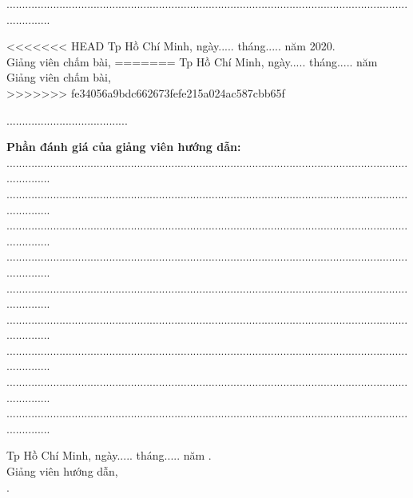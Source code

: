 	...............................................................................................................................................
\begin{center}
<<<<<<< HEAD
	\hspace*{5cm} Tp Hồ Chí Minh, ngày..... tháng..... năm 2020.\\
	\hspace*{5cm} Giảng viên chấm bài,
=======
	\hspace*{5cm} Tp Hồ Chí Minh, ngày..... tháng..... năm \.\\
	\hspace*{5cm} Giảng viên chấm bài,\\
>>>>>>> fe34056a9bdc662673fefe215a024ac587cbb65f
	\vspace{1.2cm}
	
	\hspace*{5cm} .......................................
\end{center}
	\vspace*{0.5cm}
	\textbf{Phần đánh giá của giảng viên hướng dẫn:}\\
	...............................................................................................................................................\\
	...............................................................................................................................................\\
	...............................................................................................................................................\\
	...............................................................................................................................................\\
	...............................................................................................................................................\\
	...............................................................................................................................................\\
	...............................................................................................................................................\\
	...............................................................................................................................................\\
	...............................................................................................................................................
\begin{center}
	\hspace*{5cm} Tp Hồ Chí Minh, ngày..... tháng..... năm \nam.\\
	\hspace*{5cm} Giảng viên hướng dẫn,\\
	\vspace*{2cm}
	\hspace*{5cm} \gvhd.
\newpage
\end{center}
